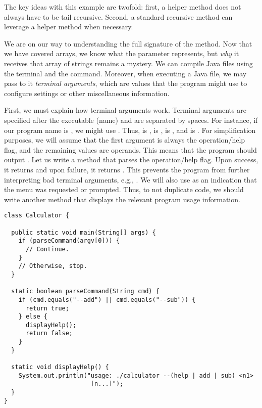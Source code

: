 The key ideas with this example are twofold: first, a helper method does not always have to be tail recursive. Second, a standard recursive method can leverage a helper method when necessary.

We are on our way to understanding the full signature of the  method. Now that we have covered arrays, we know what the  parameter represents, but \emph{why} it receives that array of strings remains a mystery. We can compile Java files using the terminal and the  command. Moreover, when executing a Java file, we may pass to it \emph{terminal arguments}, which are values that the program might use to configure settings or other miscellaneous information.


First, we must explain how terminal arguments work. Terminal arguments are specified after the executable (name) and are separated by spaces. For instance, if our program name is , we might use . Thus,  is ,  is ,  is , and  is . For simplification purposes, we will assume that the first argument is always the operation/help flag, and the remaining values are operands. This means that the program should output . Let us write a method that parses the operation/help flag. Upon success, it returns  and upon failure, it returns . This prevents the program from further interpreting bad terminal arguments, e.g., . We will also use  as an indication that the  menu was requested or prompted. Thus, to not duplicate code, we should write another method that displays the relevant program usage information.

\begin{lstlisting}[language=MyJava]
class Calculator {

  public static void main(String[] args) {
    if (parseCommand(argv[0])) {
      // Continue.
    }
    // Otherwise, stop.
  }

  static boolean parseCommand(String cmd) {
    if (cmd.equals("--add") || cmd.equals("--sub")) {
      return true;
    } else {
      displayHelp();
      return false;
    }
  }

  static void displayHelp() {
    System.out.println("usage: ./calculator --(help | add | sub) <n1> 
                        [n...]");
  }
}
\end{lstlisting}

